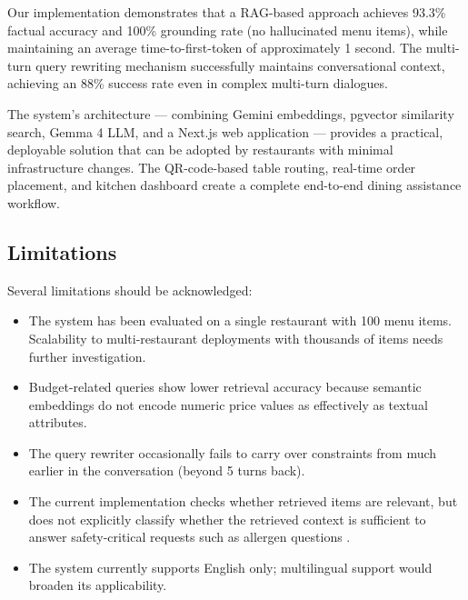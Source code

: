 Our implementation demonstrates that a RAG-based approach achieves 93.3\% factual accuracy and 100\% grounding rate (no hallucinated menu items), while maintaining an average time-to-first-token of approximately 1 second. The multi-turn query rewriting mechanism successfully maintains conversational context, achieving an 88\% success rate even in complex multi-turn dialogues.

The system's architecture --- combining Gemini embeddings, pgvector similarity search, Gemma 4 LLM, and a Next.js web application --- provides a practical, deployable solution that can be adopted by restaurants with minimal infrastructure changes. The QR-code-based table routing, real-time order placement, and kitchen dashboard create a complete end-to-end dining assistance workflow.

\subsection{Limitations}
Several limitations should be acknowledged:
\begin{itemize}
    \item The system has been evaluated on a single restaurant with 100 menu items. Scalability to multi-restaurant deployments with thousands of items needs further investigation.
    \item Budget-related queries show lower retrieval accuracy because semantic embeddings do not encode numeric price values as effectively as textual attributes.
    \item The query rewriter occasionally fails to carry over constraints from much earlier in the conversation (beyond 5 turns back).
    \item The current implementation checks whether retrieved items are relevant, but does not explicitly classify whether the retrieved context is sufficient to answer safety-critical requests such as allergen questions \cite{Rashtchian2025SufficientContextBlog}.
    \item The system currently supports English only; multilingual support would broaden its applicability.
\end{itemize}

